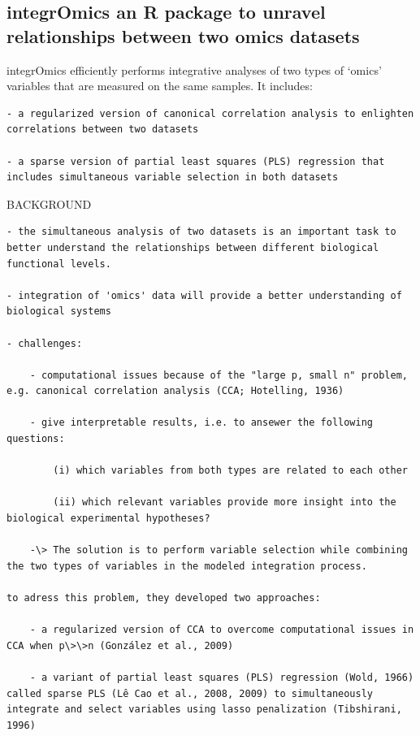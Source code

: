 \documentclass[
]{book}
\begin{document}
\hypertarget{integromics-an-r-package-to-unravel-relationships-between-two-omics-datasets}{%
\subsection{integrOmics an R package to unravel relationships between two omics datasets}\label{integromics-an-r-package-to-unravel-relationships-between-two-omics-datasets}}

integrOmics efficiently performs integrative analyses of two types of `omics' variables that are measured on the same samples. It includes:

\begin{verbatim}
- a regularized version of canonical correlation analysis to enlighten correlations between two datasets

- a sparse version of partial least squares (PLS) regression that includes simultaneous variable selection in both datasets
\end{verbatim}

BACKGROUND

\begin{verbatim}
- the simultaneous analysis of two datasets is an important task to better understand the relationships between different biological functional levels.

- integration of 'omics' data will provide a better understanding of biological systems

- challenges:

    - computational issues because of the "large p, small n" problem, e.g. canonical correlation analysis (CCA; Hotelling, 1936)

    - give interpretable results, i.e. to ansewer the following questions:

        (i) which variables from both types are related to each other

        (ii) which relevant variables provide more insight into the biological experimental hypotheses?

    -\> The solution is to perform variable selection while combining the two types of variables in the modeled integration process.

to adress this problem, they developed two approaches:

    - a regularized version of CCA to overcome computational issues in CCA when p\>\>n (González et al., 2009)

    - a variant of partial least squares (PLS) regression (Wold, 1966) called sparse PLS (Lê Cao et al., 2008, 2009) to simultaneously integrate and select variables using lasso penalization (Tibshirani, 1996)
\end{verbatim}
\end{document}
